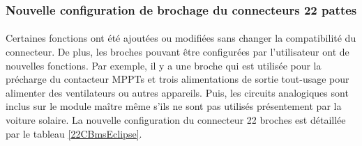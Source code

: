	
	\subsubsection{Nouvelle configuration de brochage du connecteurs 22 pattes}	
		\paragraph*{}
		Certaines fonctions ont été ajoutées ou modifiées sans changer la compatibilité du connecteur. De plus, les broches pouvant être configurées par l'utilisateur ont de nouvelles fonctions. Par exemple, il y a une broche qui est utilisée pour la précharge du contacteur MPPTs et trois alimentations de sortie tout-usage pour alimenter des ventilateurs ou autres appareils. Puis, les circuits analogiques sont inclus sur le module maître même s'ils ne sont pas utilisés présentement par la voiture solaire. La nouvelle configuration du connecteur 22 broches est détaillée par le tableau \ref{22CBmsEclipse}.
		
